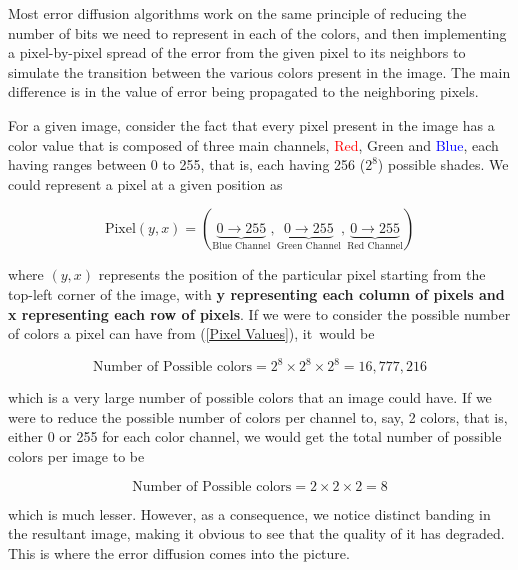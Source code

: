 \documentclass{article}
\begin{document}
Most error diffusion algorithms work on the same principle\cite{computerphile} of reducing the number of bits we need to represent in each of the colors, and then implementing a pixel-by-pixel spread of the error from the given pixel to its neighbors to simulate the transition between the various colors present in the image. The main difference is in the value of error being propagated to the neighboring pixels.

\medskip
\noindent For a given image, consider the fact that every pixel present in the image has a color value that is composed of three main channels, \textcolor{red}{Red}, \textcolor{Green4}{Green} and \textcolor{blue}{Blue}, each having ranges between 0 to 255, that is, each having 256 ($2^8$) possible shades. We could represent a pixel at a given position as

 \begin{equation} 
    \text{Pixel}(y,x) = (\underbrace{0\to255}_\text{Blue Channel},\underbrace{0\to255}_\text{Green Channel},\underbrace{0\to255}_\text{Red Channel})\label{Pixel Values}
 \end{equation}

\noindent where $(y,x)$ represents the position of the particular pixel starting from the top-left corner of the image, with \textbf{y representing each column of pixels and x representing each row of pixels}. If we were to consider the possible number of colors a pixel can have from (\ref{Pixel Values}), it\ would be

$$\text{Number of Possible colors} = 2^8\times2^8\times2^8 = 16,777,216$$

\noindent which is a very large number of possible colors that an image could have. If we were to reduce the possible number of colors per channel to, say, 2 colors, that is, either 0 or 255 for each color channel, we would get the total number of possible colors per image to be 

$$\text{Number of Possible colors} = 2\times2\times2 = 8$$

\noindent which is much lesser. However, as a consequence, we notice distinct banding in the resultant image, making it obvious to see that the quality of it has degraded. This is where the error diffusion comes into the picture.

\medskip
\end{document}
